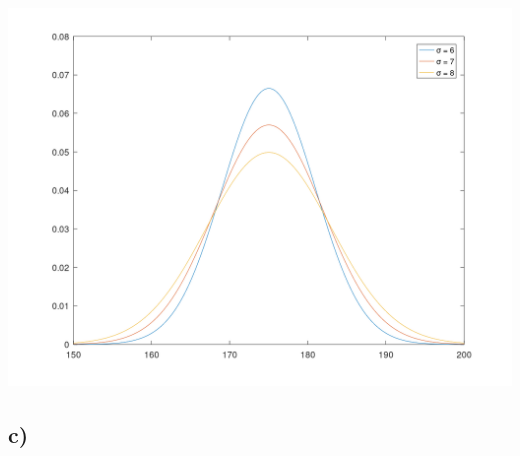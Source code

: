 \documentclass[12pt]{article}
\begin{document}
\includegraphics[width=\textwidth]{the2_plot.png}

\subsection*{c)} 
\end{document}
